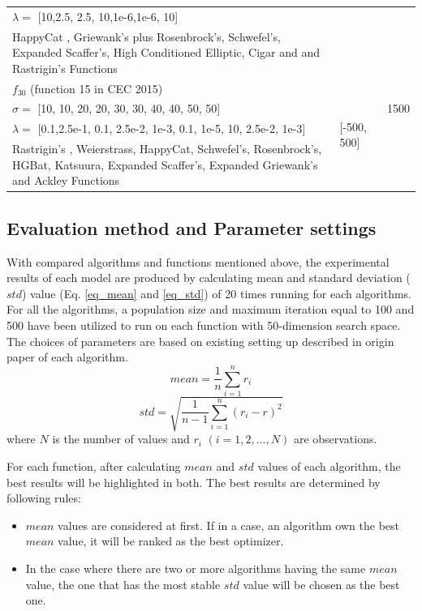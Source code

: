 \documentclass[a4paper,13pt,2p]{report}
\begin{document}
\begin{table}[!t]
\begin{tabular}{p{9cm} p{2cm} p{1cm}}
$\lambda = $  [10,2.5, 2.5, 10,1e-6,1e-6, 10] & \\
HappyCat , Griewank’s plus Rosenbrock’s, Schwefel's, Expanded Scaffer’s, High Conditioned Elliptic, Cigar and  and Rastrigin’s  Functions & \\ \hline
$f_{30}$ (function 15 in CEC 2015) & \multirow{4}{*}{[-500, 500]} & \multirow{3}{*}{1500} \\
$\sigma = $  [10, 10, 20, 20, 30, 30, 40, 40, 50, 50] & \\
$\lambda = $  [0.1,2.5e-1, 0.1, 2.5e-2, 1e-3, 0.1, 1e-5, 10, 2.5e-2, 1e-3] & \\
Rastrigin’s  , Weierstrass, HappyCat, Schwefel's, Rosenbrock's, HGBat, Katsuura, Expanded Scaffer’s, Expanded Griewank’s  and  Ackley  Functions & \\ \hline

\end{tabular}
\end{table}

\subsection{Evaluation method and Parameter settings}

	With compared algorithms and functions mentioned above, the experimental results of each model are produced by calculating mean and standard deviation ($std$) value (Eq. \ref{eq_mean} and \ref{eq_std}) of 20 times running for each algorithms. For all the algorithms, a population size and maximum iteration equal to 100 and 500 have been utilized to run on each function with 50-dimension search space. The choices  of parameters are based on existing setting up
described in origin paper of each algorithm.
\begin{equation} \label{eq_mean}
mean = \frac{1}{n}\sum_{i=1}^n r_i
\end{equation}
\begin{equation}\label{eq_std}
std = \sqrt{\frac{1}{n-1}\sum_{i=1}^n(r_i - r)^2}
\end{equation}
where $N$ is the number of values and $r_i$ $(i = 1, 2, ..., N)$ are observations.
	
	For each function, after calculating $mean$ and $std$ values of each algorithm, the best results will be highlighted in both. The best results are determined by following rules:
\begin{itemize}
\item $mean$ values are considered at first. If in a case, an algorithm own the best $mean$ value, it will be ranked as the best optimizer.
\item In the case where there are two or more algorithms having the same $mean$ value, the one that has the most stable $std$ value will be chosen as the best one.
\end{itemize}
	
\end{document}
